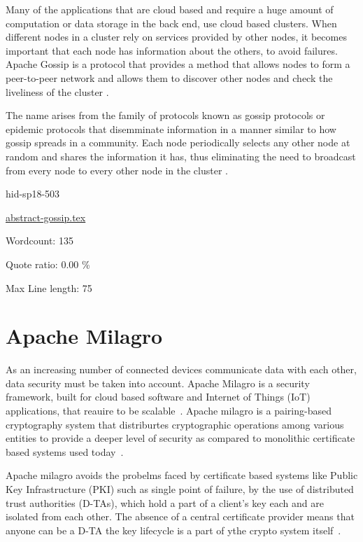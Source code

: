Many of the applications that are cloud based and require a huge amount of
computation or data storage in the back end, use cloud based clusters. When
different nodes in a cluster rely on services provided by other nodes, it
becomes important that each node has information about the others, to avoid
failures. Apache Gossip is a protocol that provides a method that allows
nodes to form a peer-to-peer network and allows them to discover other
nodes and check the liveliness of the cluster
\cite{hid-sp18-503-www-gossip}.

The name arises from the family of protocols known as gossip protocols or
epidemic protocols that disemminate information in a manner similar to how
gossip spreads in a community. Each node periodically selects any other
node at random and shares the information it has, thus eliminating the need
to broadcast from every node to every other node in the cluster
\cite{hid-sp18-503-www-gossip-wiki}.


\begin{IU}

hid-sp18-503

\href{https://github.com/cloudmesh-community/hid-sp18-503/blob/master//technology/abstract-gossip.tex}{abstract-gossip.tex}

 

Wordcount: 135


Quote ratio: 0.00 \%
 
Max Line length: 75
\end{IU}

\section{Apache Milagro}

As an increasing number of connected devices communicate data with
each other, data security must be taken into account. Apache Milagro
is a security framework, built for cloud based software and Internet
of Things (IoT) applications, that reauire to be
scalable~\cite{hid-sp18-503-www-milagro}. Apache milagro is a
pairing-based cryptography system that distriburtes cryptographic
operations among various entities to provide a deeper level of
security as compared to monolithic certificate based systems used
today~\cite{hid-sp18-503-www-milagro-docs}.

Apache milagro avoids the probelms faced by certificate based systems
like Public Key Infrastructure (PKI) such as single point of failure,
by the use of distributed trust authorities (D-TAs), which hold a part
of a client's key each and are isolated from each other. The absence
of a central certificate provider means that anyone can be a D-TA the
key lifecycle is a part of ythe crypto system
itself~\cite{hid-sp18-503-www-milagro-docs}.


